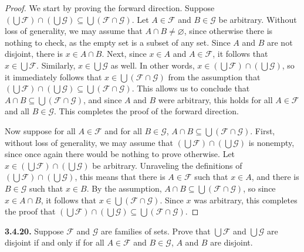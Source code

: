\documentclass[12pt]{amsart}
\newenvironment{statement}[1]{\smallskip\noindent\color[rgb]{.6627, .3529, .6314} {\bf #1.}}{}
\theoremstyle{definition}
\theoremstyle{remark}
\begin{document}
\begin{proof}
We start by proving the forward direction.
Suppose $\left( \bigcup \mathcal{F} \right) \cap \left( \bigcup \mathcal{G} \right) \subseteq \bigcup (\mathcal{F} \cap \mathcal{G})$.
Let $A \in \mathcal{F}$ and $B \in \mathcal{G}$ be arbitrary.
Without loss of generality, we may assume that $A \cap B \neq \varnothing$, since otherwise there is nothing to check, as the empty set is a subset of any set.
Since $A$ and $B$ are not disjoint, there is $x \in A \cap B$.
Next, since $x \in A$ and $A \in \mathcal{F}$, it follows that $x \in \bigcup \mathcal{F}$.
Similarly, $x \in \bigcup \mathcal{G}$ as well.
In other words, $x \in \left( \bigcup \mathcal{F} \right) \cap \left( \bigcup \mathcal{G} \right)$, so it immediately follows that $x \in \bigcup (\mathcal{F} \cap \mathcal{G})$ from the assumption that $\left( \bigcup \mathcal{F} \right) \cap \left( \bigcup \mathcal{G} \right) \subseteq \bigcup (\mathcal{F} \cap \mathcal{G})$.
This allows us to conclude that $A \cap B \subseteq \bigcup (\mathcal{F} \cap \mathcal{G})$, and since $A$ and $B$ were arbitrary, this holds for all $A \in \mathcal{F}$ and all $B \in \mathcal{G}$.
This completes the proof of the forward direction.

Now suppose for all $A \in \mathcal{F}$ and for all $B \in \mathcal{G}$, $A \cap B \subseteq \bigcup (\mathcal{F} \cap \mathcal{G})$.
First, without loss of generality, we may assume that $\left( \bigcup \mathcal{F} \right) \cap \left( \bigcup \mathcal{G} \right)$ is nonempty, since once again there would be nothing to prove otherwise.
Let $x \in \left( \bigcup \mathcal{F} \right) \cap \left( \bigcup \mathcal{G} \right)$ be arbitrary.
Unraveling the definitions of $\left( \bigcup \mathcal{F} \right) \cap \left( \bigcup \mathcal{G} \right)$, this means that there is $A \in \mathcal{F}$ such that $x \in A$, and there is $B \in \mathcal{G}$ such that $x \in B$.
By the assumption, $A \cap B \subseteq \bigcup (\mathcal{F} \cap \mathcal{G})$, so since $x \in A \cap B$, it follows that $x \in \bigcup (\mathcal{F} \cap \mathcal{G})$.
Since $x$ was arbitrary, this completes the proof that $\left( \bigcup \mathcal{F} \right) \cap \left( \bigcup \mathcal{G} \right) \subseteq \bigcup (\mathcal{F} \cap \mathcal{G})$.
\end{proof}


\begin{statement}{3.4.20}
Suppose $\mathcal{F}$ and $\mathcal{G}$ are families of sets.
Prove that $\bigcup \mathcal{F}$ and $\bigcup \mathcal{G}$ are disjoint if and only if for all $A \in \mathcal{F}$ and $B \in \mathcal{G}$, $A$ and $B$ are disjoint.
\end{statement}
\end{document}
